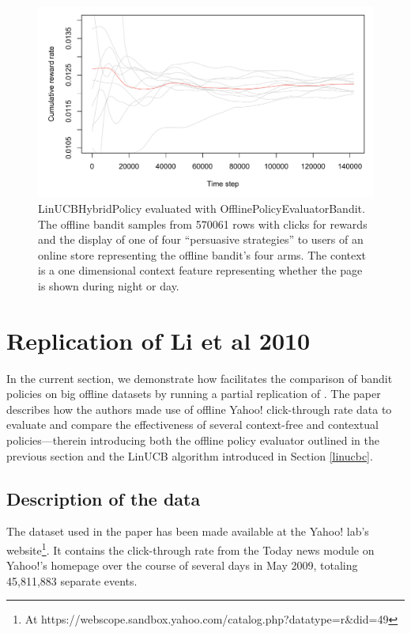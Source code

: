 \documentclass{jss}
\begin{document}
\begin{figure}[H]
  \centering
    \includegraphics[width=.99\textwidth]{fig/offline_bandit}

      \caption{LinUCBHybridPolicy evaluated with OfflinePolicyEvaluatorBandit. The offline bandit samples from 570061 rows with clicks for rewards and the display of one of four “persuasive strategies” to users of an online store representing the offline bandit's four arms. The context is a one dimensional context feature representing whether the page is shown during night or day. }
      \label{fig:offline_bandit}
\end{figure}

\section{Replication of Li et al 2010} \label{repl}

In the current section, we demonstrate how  facilitates the comparison of bandit policies on big offline datasets by running a partial replication of \cite{Li2010}. The paper describes how the authors made use of offline Yahoo! click-through rate data to evaluate and compare the effectiveness of several context-free and contextual policies---therein introducing both the offline policy evaluator outlined in the previous section and the LinUCB algorithm introduced in Section \ref{linucbc}.

\subsection{Description of the data} \label{datadesc}

The dataset used in the \cite{Li2010} paper has been made available at the Yahoo! lab's website\footnote{At https://webscope.sandbox.yahoo.com/catalog.php?datatype=r\&did=49}. It contains the click-through rate from the Today news module on Yahoo!'s homepage over the course of several days in May 2009, totaling 45,811,883 separate events.
\end{document}
